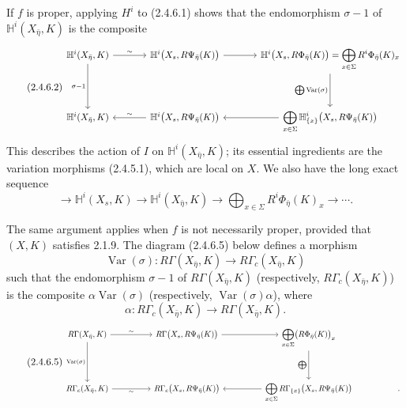 If $f$ is proper, applying $H^i$ to (2.4.6.1) shows that the
endomorphism $\sigma-1$ of $\mathbb H^i(X_{\bar\eta},K)$ is the
composite
\begin{equation}\tag{2.4.6.2}
\resizebox{\textwidth}{!}{%
\begin{tikzcd}[ampersand replacement=\&, column sep=large, row sep=huge]
\mathbb H^i(X_{\bar\eta},K)
  \arrow[r, "\sim"] \arrow[d, "\sigma-1"']
  \& \mathbb H^i\bigl(X_s,R\Psi_{\bar\eta}(K)\bigr)
     \arrow[r]
  \& \mathbb H^i\bigl(X_s,R\Phi_{\bar\eta}(K)\bigr)
     =\displaystyle\bigoplus_{x\in\Sigma}R^i\Phi_{\bar\eta}(K)_x
     \arrow[d, "{\bigoplus\operatorname{Var}(\sigma)}"'] \\
\mathbb H^i(X_{\bar\eta},K)
  \& \mathbb H^i\bigl(X_s,R\Psi_{\bar\eta}(K)\bigr)
     \arrow[l, "\sim"']
  \& \displaystyle\bigoplus_{x\in\Sigma}
     \mathbb H^i_{\{x\}}\bigl(X_s,R\Psi_{\bar\eta}(K)\bigr)
     \arrow[l]
\end{tikzcd}}
\end{equation}
This describes the action of $I$ on $\mathbb H^i(X_{\bar\eta},K)$;
its essential ingredients are the variation morphisms (2.4.5.1),
which are local on $X$.  We also have the long exact sequence
\begin{equation}\tag{2.4.6.3}
\longrightarrow \mathbb H^i(X_s,K)
\longrightarrow \mathbb H^i(X_{\bar\eta},K)
\longrightarrow \bigoplus_{x\in\Sigma}R^i\Phi_{\bar\eta}(K)_x
\longrightarrow\cdots .
\end{equation}

The same argument applies when $f$ is not necessarily proper,
provided that $(X,K)$ satisfies 2.1.9.  The diagram (2.4.6.5) below
defines a morphism
\begin{equation}\tag{2.4.6.4}
\operatorname{Var}(\sigma):
R\Gamma(X_{\bar\eta},K)\longrightarrow R\Gamma_c(X_{\bar\eta},K)
\end{equation}
such that the endomorphism $\sigma-1$ of
$R\Gamma(X_{\bar\eta},K)$ (respectively,
$R\Gamma_c(X_{\bar\eta},K)$) is the composite
$\alpha\operatorname{Var}(\sigma)$ (respectively,
$\operatorname{Var}(\sigma)\alpha$), where
\[
\alpha:R\Gamma_c(X_{\bar\eta},K)\longrightarrow
R\Gamma(X_{\bar\eta},K).
\]
\begin{equation}\tag{2.4.6.5}
\resizebox{\textwidth}{!}{%
\begin{tikzcd}[ampersand replacement=\&, column sep=huge, row sep=huge]
R\Gamma(X_{\bar\eta},K)
  \arrow[r, "\sim"] \arrow[d, "\operatorname{Var}(\sigma)"']
  \& R\Gamma\bigl(X_s,R\Psi_{\bar\eta}(K)\bigr)
     \arrow[r]
  \& \displaystyle\bigoplus_{x\in\Sigma}
     \bigl(R\Phi_{\bar\eta}(K)\bigr)_x
     \arrow[d, "\bigoplus"']
  \& {} \\
R\Gamma_c(X_{\bar\eta},K)
  \arrow[r, "\sim"']
  \& R\Gamma_c\bigl(X_s,R\Psi_{\bar\eta}(K)\bigr)
  \& \displaystyle\bigoplus_{x\in\Sigma}
     R\Gamma_{\{x\}}\bigl(X_s,R\Psi_{\bar\eta}(K)\bigr)
     \arrow[l]
  \& .
\end{tikzcd}}
\end{equation}

